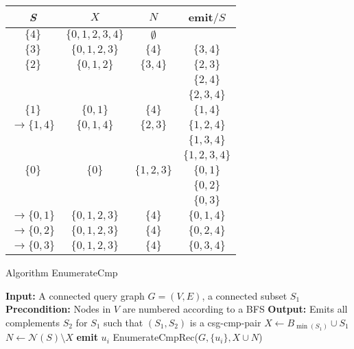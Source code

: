 \documentclass[12pt]{article}
\begin{document}
\begin{flushleft}
\begin{center}
    \renewcommand{\arraystretch}{1.3} %
    \begin{tabular}{|c|c|c|c|}
        \hline
        \textbf{\textit{S}} & $X$ & $N$ & emit$/S$ \\ 
        \hline
        $\{4\}$ & $\{0,1,2,3,4\}$ & $\emptyset$ & \\ 
        \hline
        $\{3\}$ & $\{0,1,2,3\}$ & $\{4\}$ & $\{3,4\}$ \\ 
        \hline
        $\{2\}$ & $\{0,1,2\}$ & $\{3,4\}$ & $\{2,3\}$ \\ 
        &  &  & $\{2,4\}$ \\ 
        &  &  & $\{2,3,4\}$ \\ 
        \hline
        $\{1\}$ & $\{0,1\}$ & $\{4\}$ & $\{1,4\}$ \\ 
        \hline
        $\rightarrow \{1,4\}$ & $\{0,1,4\}$ & $\{2,3\}$ & $\{1,2,4\}$ \\ 
        &  &  & $\{1,3,4\}$ \\ 
        &  &  & $\{1,2,3,4\}$ \\ 
        \hline
        $\{0\}$ & $\{0\}$ & $\{1,2,3\}$ & $\{0,1\}$ \\ 
        &  &  & $\{0,2\}$ \\ 
        &  &  & $\{0,3\}$ \\ 
        \hline
        $\rightarrow \{0,1\}$ & $\{0,1,2,3\}$ & $\{4\}$ & $\{0,1,4\}$ \\ 
        \hline
        $\rightarrow \{0,2\}$ & $\{0,1,2,3\}$ & $\{4\}$ & $\{0,2,4\}$ \\ 
        \hline
        $\rightarrow \{0,3\}$ & $\{0,1,2,3\}$ & $\{4\}$ & $\{0,3,4\}$ \\ 
        \hline
    \end{tabular}
\end{center}


\begin{algorithm}
    Algorithm EnumerateCmp
    \begin{algorithmic}[1]
        \State \textbf{Input:} A connected query graph $G = (V, E)$, a connected subset $S_1$
        \State \textbf{Precondition:} Nodes in $V$ are numbered according to a BFS
        \State \textbf{Output:} Emits all complements $S_2$ for $S_1$ such that $(S_1, S_2)$ is a csg-cmp-pair
        \State $X \gets B_{\min(S_1)} \cup S_1$
        \State $N \gets \mathcal{N}(S) \setminus X$
            \State \textbf{emit} $u_i$
            \State EnumerateCmpRec($G, \{u_i\}, X \cup N$)
        \EndFor
    \end{algorithmic}
\end{algorithm}


\end{flushleft}
\end{document}
